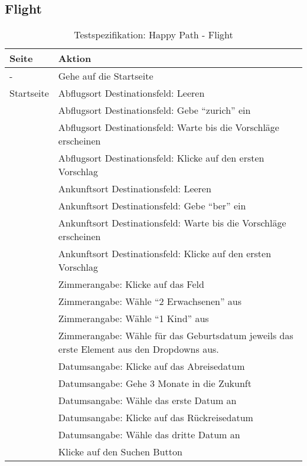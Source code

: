 \subsection{Flight}
\begin{table}[H] 
	\caption{Testspezifikation: Happy Path - Flight}
	\centering
		
	\begin{tabularx}{0.9\textwidth}{ | l | X | } 
		\hline 
		\textbf{Seite} & \textbf{Aktion} \\ \hline 
		\multirow{1}{*}{-} & Gehe auf die Startseite \\ \hline
		\multirow{1}{*}{Startseite} & Abflugsort Destinationsfeld: Leeren \\ \cline{2-2}
		& Abflugsort Destinationsfeld: Gebe "`zurich"' ein \\ \cline{2-2}
		& Abflugsort Destinationsfeld: Warte bis die Vorschläge erscheinen \\ \cline{2-2}
		& Abflugsort Destinationsfeld: Klicke auf den ersten Vorschlag \\ \cline{2-2}
		& Ankunftsort Destinationsfeld: Leeren \\ \cline{2-2}
		& Ankunftsort Destinationsfeld: Gebe "`ber"' ein \\ \cline{2-2}
		& Ankunftsort Destinationsfeld: Warte bis die Vorschläge erscheinen \\ \cline{2-2}
		& Ankunftsort Destinationsfeld: Klicke auf den ersten Vorschlag \\ \cline{2-2}
		& Zimmerangabe: Klicke auf das Feld \\ \cline{2-2}
		& Zimmerangabe: Wähle "`2 Erwachsenen"' aus \\ \cline{2-2}
		& Zimmerangabe: Wähle "`1 Kind"' aus \\ \cline{2-2}
		& Zimmerangabe: Wähle für das Geburtsdatum jeweils das erste Element aus den Dropdowns aus.  \\ \cline{2-2}
		& Datumsangabe: Klicke auf das Abreisedatum \\ \cline{2-2}
		& Datumsangabe: Gehe 3 Monate in die Zukunft \\ \cline{2-2}
		& Datumsangabe: Wähle das erste Datum an \\ \cline{2-2}
		& Datumsangabe: Klicke auf das Rückreisedatum \\ \cline{2-2}
		& Datumsangabe: Wähle das dritte Datum an \\ \cline{2-2}
		& Klicke auf den Suchen Button \\ \hline
				

\end{tabularx}
\end{table}
